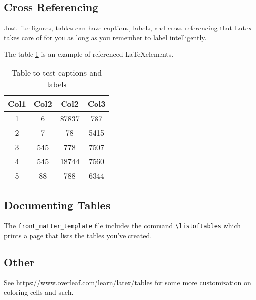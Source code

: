 \subsection{Cross Referencing}\label{table_cross_referencing}
Just like figures, tables can have captions, labels, and cross-referencing that Latex takes care of for you as long as you remember to label intelligently.

The table \ref{table:1} is an example of referenced \LaTeX elements.

\begin{table}[h!]
	\centering
	\begin{tabular}{||c c c c||} 
		\hline
		Col1 & Col2 & Col2 & Col3 \\ [0.5ex] 
		\hline\hline
		1 & 6 & 87837 & 787 \\ 
		2 & 7 & 78 & 5415 \\
		3 & 545 & 778 & 7507 \\
		4 & 545 & 18744 & 7560 \\
		5 & 88 & 788 & 6344 \\ [1ex] 
		\hline
	\end{tabular}
	\caption{Table to test captions and labels}
	\label{table:1}
\end{table}

\subsection{Documenting Tables}
The \verb+front_matter_template+ file includes the command \verb+\listoftables+ which prints a page that lists the tables you've created.

\subsection{Other }
See \url{https://www.overleaf.com/learn/latex/tables} for some more customization on coloring cells and such.
